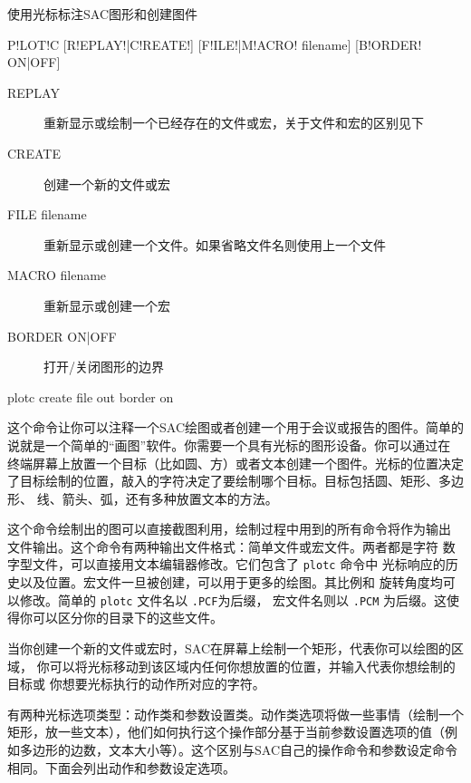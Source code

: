 \label{cmd:plotc}

使用光标标注SAC图形和创建图件

\begin{SACSTX}
P!LOT!C [R!EPLAY!|C!REATE!] [F!ILE!|M!ACRO! filename] [B!ORDER! ON|OFF]
\end{SACSTX}

\begin{description}
\item [REPLAY] 重新显示或绘制一个已经存在的文件或宏，关于文件和宏的区别见下
\item [CREATE] 创建一个新的文件或宏
\item [FILE filename] 重新显示或创建一个文件。如果省略文件名则使用上一个文件
\item [MACRO filename] 重新显示或创建一个宏
\item [BORDER ON|OFF] 打开/关闭图形的边界
\end{description}

\begin{SACDFT}
plotc create file out border on
\end{SACDFT}

这个命令让你可以注释一个SAC绘图或者创建一个用于会议或报告的图件。简单的
说就是一个简单的``画图''软件。你需要一个具有光标的图形设备。你可以通过在
终端屏幕上放置一个目标（比如圆、方）或者文本创建一个图件。光标的位置决定
了目标绘制的位置，敲入的字符决定了要绘制哪个目标。目标包括圆、矩形、多边形、
线、箭头、弧，还有多种放置文本的方法。

这个命令绘制出的图可以直接截图利用，绘制过程中用到的所有命令将作为输出
文件输出。这个命令有两种输出文件格式：简单文件或宏文件。两者都是字符
数字型文件，可以直接用文本编辑器修改。它们包含了 \texttt{plotc} 命令中
光标响应的历史以及位置。宏文件一旦被创建，可以用于更多的绘图。其比例和
旋转角度均可以修改。简单的 \texttt{plotc} 文件名以 \texttt{.PCF}为后缀，
宏文件名则以 \texttt{.PCM} 为后缀。这使得你可以区分你的目录下的这些文件。

当你创建一个新的文件或宏时，SAC在屏幕上绘制一个矩形，代表你可以绘图的区域，
你可以将光标移动到该区域内任何你想放置的位置，并输入代表你想绘制的目标或
你想要光标执行的动作所对应的字符。

有两种光标选项类型：动作类和参数设置类。动作类选项将做一些事情（绘制一个
矩形，放一些文本），他们如何执行这个操作部分基于当前参数设置选项的值（例
如多边形的边数，文本大小等）。这个区别与SAC自己的操作命令和参数设定命令
相同。下面会列出动作和参数设定选项。

